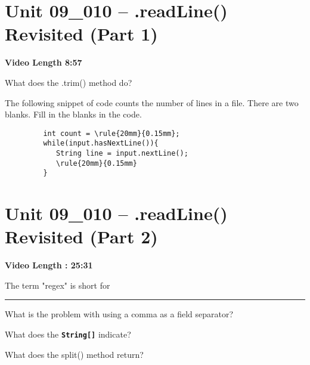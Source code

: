 \documentclass[letterpaper,12pt]{exam}
\newcommand{\unit}{Unit 09}
\begin{document}
\section*{\unit\_010 -- .readLine() Revisited (Part 1)} 
\par{\selectfont\textbf{Video Length 8:57}}
\begin{questions}
\begin{samepage}
    \question What does the .trim() method do?
    \vspace{5mm}
\end{samepage}

\begin{samepage}
    \question The following snippet of code counts the number of lines in a file.  There are two blanks.  Fill in the blanks in the code.
    \begin{verbatim}
         int count = \rule{20mm}{0.15mm};
         while(input.hasNextLine()){
            String line = input.nextLine();
            \rule{20mm}{0.15mm}
         }    
    \end{verbatim}
    \vspace{5mm}
\end{samepage}


\section*{\unit\_010 -- .readLine() Revisited (Part 2)} 
\par{\selectfont\textbf{Video Length : 25:31}}

\begin{samepage}
    \question The term "regex" is short for \rule{50mm}{0.15mm}
    \vspace{5mm}
\end{samepage}

\begin{samepage}
    \question What is the problem with using a comma as a field separator?
    \vspace{5mm}
\end{samepage}


\begin{samepage}
    \question What does the \texttt{\textbf{String[]}} indicate?
    \vspace{5mm}
\end{samepage}

\begin{samepage}
    \question What does the split() method return?
    \vspace{5mm}
\end{samepage}


\end{questions}
\end{document}
